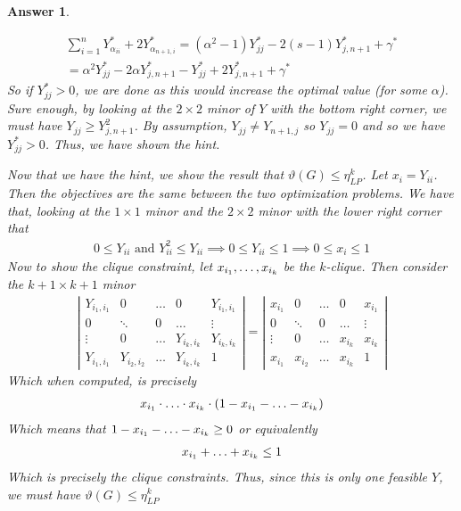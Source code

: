 \documentclass[12pt]{article}
\theoremstyle{colon}
\newtheorem*{answer}{Answer}
\begin{document}
\begin{answer}
\begin{enumerate}[label=\arabic*)]
      \begin{gather*}
        \sum_{i=1}^n Y_{\alpha_{ii}}^* + 2 Y_{\alpha_{n+1, i}}^* = (\alpha^2 - 1) Y_{jj}^* - 2(s-1) Y_{j, n+1}^* + \gamma^* \\
        = \alpha^2 Y_{jj}^* - 2\alpha Y_{j, n+1}^* - Y_{jj}^* + 2 Y_{j, n+1}^* + \gamma^*
      \end{gather*}
      So if $Y_{jj}^* > 0$, we are done as this would increase the optimal value (for some $\alpha$). Sure enough, by looking at the $2 \times 2$ minor of $Y$ with the bottom right corner, we must have $ Y_{jj} \geq Y_{j, n+1}^2$. By assumption, $Y_{jj} \neq Y_{n+1,j}$ so $Y_{jj} = 0$ and so we have $Y_{jj}^* > 0$. Thus, we have shown the hint.

      Now that we have the hint, we show the result that $\vartheta(G) \leq \eta_{LP}^k$. Let $x_i = Y_{ii}$. Then the objectives are the same between the two optimization problems. We have that, looking at the $1 \times 1$ minor and the $2 \times 2$ minor with the lower right corner that
      \begin{gather*}
        0 \leq Y_{ii} \text{ and } Y_{ii}^2 \leq Y_{ii} \implies 0 \leq Y_{ii} \leq 1 \implies 0 \leq x_i \leq 1
      \end{gather*}
      Now to show the clique constraint, let $x_{i_1}, \mathellipsis, x_{i_k}$ be the $k$-clique. Then consider the $k+1 \times k+1$ minor
      \begin{gather*}
        \left\lvert \begin{matrix}
          Y_{i_1, i_1} & 0 & \dots & 0 & Y_{i_1, i_1} \\
          0 & \ddots & 0 & \dots & \vdots \\
          \vdots & 0 & \dots & Y_{i_k, i_k} & Y_{i_k, i_k} \\
          Y_{i_1, i_1} & Y_{i_2, i_2} & \dots & Y_{i_k, i_k} & 1
        \end{matrix} \right\rvert = \left\lvert \begin{matrix}
          x_{i_1} & 0 & \dots & 0 & x_{i_1} \\
          0 & \ddots & 0 & \dots & \vdots \\
          \vdots & 0 & \dots & x_{i_k} & x_{i_k} \\
          x_{i_1} & x_{i_2} & \dots & x_{i_k} & 1
        \end{matrix} \right\rvert
      \end{gather*}
      Which when computed, is precisely
      \begin{gather*}
        x_{i_1} \cdot \mathellipsis \cdot x_{i_k} \cdot (1 - x_{i_1} - \mathellipsis - x_{i_k})
      \end{gather*}
      Which means that $1 - x_{i_1} - \mathellipsis - x_{i_k} \geq 0$ or equivalently
      \begin{gather*}
        x_{i_1} + \mathellipsis + x_{i_k} \leq 1
      \end{gather*}
      Which is precisely the clique constraints. Thus, since this is only one feasible $Y$, we must have $\vartheta(G) \leq \eta_{LP}^k$


\end{enumerate}
\end{answer}
\end{document}
